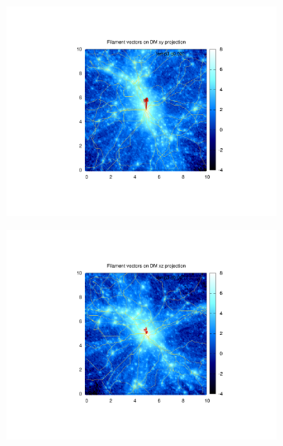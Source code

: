 \documentclass[journal]{IEEEtran}
\begin{document}
\begin{figure}[!t]
\centering
	\begin{subfigure}[t]{0.3\textwidth}
		\centering
		\includegraphics[width=\linewidth]{FilxyDM}
	\end{subfigure}
	\quad
	\begin{subfigure}[t]{0.3\textwidth}
		\centering
		\includegraphics[width=\linewidth]{FilxzDM}
	\end{subfigure}
	\quad
	\begin{subfigure}[t]{0.3\textwidth}
		\centering

\end{subfigure}
\end{figure}
\end{document}
